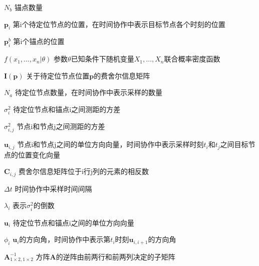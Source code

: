 \begin{denotation}[3cm]
\item[$N_b$] 锚点数量
\item[$\bm{p}_i$] 第i个待定位节点的位置，在时间协作中表示目标节点各个时刻的位置
\item[$\bm{p}^b_i$] 第i个锚点的位置
\item[$f(x_1,\dots,x_n|\theta)$] 参数$\theta$已知条件下随机变量$X_1,\dots,X_n$联合概率密度函数
\item[$\bm{I}(\bm{p})$] 关于待定位节点位置$\bm{p}$的费舍尔信息矩阵
\item[$N_a$] 待定位节点数量，在时间协作中表示采样的数量
\item[$\sigma^2_{i}$] 待定位节点和锚点i之间测距的方差
\item[$\sigma^2_{i,j}$] 节点i和节点j之间测距的方差
\item[$\bm{u}_{i,j}$] 节点i和节点j之间的单位方向向量，时间协作中表示采样时刻$t_i$和$t_j$之间目标节点的位置变化向量
\item[$\bm{C}_{i,j}$] 费舍尔信息矩阵位于i行j列的元素的相反数
\item[$\Delta t$] 时间协作中采样时间间隔
\item[$\lambda_{i}$] 表示$\sigma^2_{i}$的倒数
\item[$\bm{u}_i$] 待定位节点和锚点i之间的单位方向向量
\item[$\phi_i$] $\bm{u}_i$的方向角，时间协作中表示第$t_i$时刻$\bm{u}_{i,i+1}$的方向角
\item[$\bm{A}^{-1}_{1\times2,1\times2}$] 方阵$\bm{A}$的逆阵由前两行和前两列决定的子矩阵
\end{denotation}
